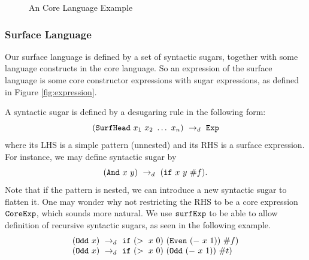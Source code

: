 \begin{figure}[t]
\begin{centering}
	\framebox[36em][c]{
		\parbox[t]{33em}{
			\[
			\begin{array}{lcl}
			\m{CoreExp} &::=& \Code{(CoreExp~CoreExp)}\\
			&|& \m{(lambda~(x)~CoreExp)}\\
			&|& \m{(lambdaN~(x)~CoreExp)}\\
			&|& \m{(if~CoreExp~CoreExp~CoreExp)}\\
			&|& \m{}
			\end{array}
			\]
		}
	}
\end{centering}
\caption{An Core Language Example}
\label{fig:core}
\end{figure}



\subsubsection{Surface Language}

Our surface language is defined by a set of syntactic sugars, together with some language constructs in the core language. So an expression of the surface language is some core constructor expressions with sugar expressions, as defined in Figure \ref{fig:expression}.

A syntactic sugar is defined by a desugaring rule in the following form:
\[
(\mbox{\tt SurfHead}~x_1~x_2~\ldots~x_n) ~\rightarrow_d~ \mbox{\tt Exp}
\]
where its LHS is a simple pattern (unnested) and its RHS is a surface expression. For instance, we may define syntactic sugar  by
\[
(\mbox{\tt And}~x~y) ~\rightarrow_d~ (\mbox{\tt if}~x~y~\#f).
\]
Note that if the pattern is nested, we can introduce a new syntactic sugar to flatten it.
One may wonder why not restricting the RHS to be a core expression $\mbox{\tt CoreExp}$, which sounds more natural. We use $\mbox{\tt surfExp}$ to be able to allow definition of recursive syntactic sugars, as seen in the following example.
\[
\begin{array}{l}
(\mbox{\tt Odd}~x) ~\rightarrow_d~ \mbox{\tt if}~(>~x~0)~(\mbox{\tt Even}~(-~x~1))~\#f)\\
(\mbox{\tt Odd}~x) ~\rightarrow_d~ \mbox{\tt if}~(>~x~0)~(\mbox{\tt Odd}~(-~x~1))~\#t)
\end{array}
\]

